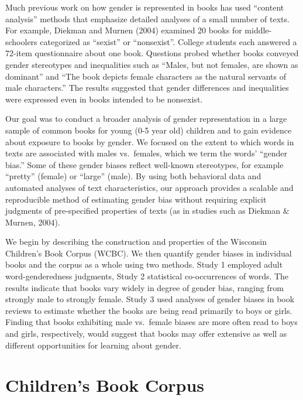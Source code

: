 \documentclass[
  english,
  ,man,floatsintext]{apa6}
\begin{document}
Much previous work on how gender is represented in books has used \enquote{content analysis} methods that emphasize detailed analyses of a small number of texts. For example, Diekman and Murnen (2004) examined 20 books for middle-schoolers categorized as \enquote{sexist} or \enquote{nonsexist}. College students each answered a 72-item questionnaire about one book. Questions probed whether books conveyed gender stereotypes and inequalities such as \enquote{Males, but not females, are shown as dominant} and \enquote{The book depicts female characters as the natural servants of male characters.} The results suggested that gender differences and inequalities were expressed even in books intended to be nonsexist.

Our goal was to conduct a broader analysis of gender representation in a large sample of common books for young (0-5 year old) children and to gain evidence about exposure to books by gender. We focused on the extent to which words in texts are associated with males vs.~females, which we term the words' \enquote{gender bias.} Some of these gender biases reflect well-known stereotypes, for example \enquote{pretty} (female) or \enquote{large} (male). By using both behavioral data and automated analyses of text characteristics, our approach provides a scalable and reproducible method of estimating gender bias without requiring explicit judgments of pre-specified properties of texts (as in studies such as Diekman \& Murnen, 2004).

We begin by describing the construction and properties of the Wisconsin Children's Book Corpus (WCBC). We then quantify gender biases in individual books and the corpus as a whole using two methods. Study 1 employed adult word-genderedness judgments, Study 2 statistical co-occurrences of words. The results indicate that books vary widely in degree of gender bias, ranging from strongly male to strongly female. Study 3 used analyses of gender biases in book reviews to estimate whether the books are being read primarily to boys or girls. Finding that books exhibiting male vs.~female biases are more often read to boys and girls, respectively, would suggest that books may offer extensive as well as different opportunities for learning about gender.

\hypertarget{childrens-book-corpus}{%
\section{Children's Book Corpus}\label{childrens-book-corpus}}
\end{document}
